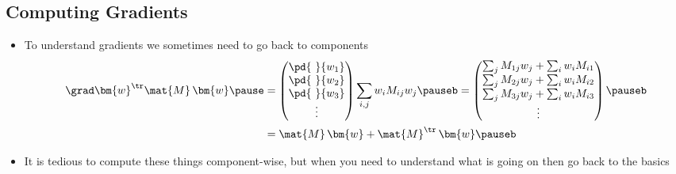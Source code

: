 \begin{slide}
\section{Computing Gradients}

\begin{PauseHighLight}
  \begin{itemize}
  \item To understand gradients we sometimes need to go back to
    components\pause
    \begin{align*}
      \grad \bm{w}^\tr \mat{M}\, \bm{w}\pause &=
      \begin{pmatrix}
        \pd{\ }{w_1} \\  \pd{\ }{w_2} \\  \pd{\ }{w_3} \\ \vdots
      \end{pmatrix}
      \sum_{i,j} w_i M_{ij} w_j \pauseb =
      \begin{pmatrix}
        \sum_j M_{1j} w_j + \sum_i w_i M_{i1} \\
        \sum_j M_{2j} w_j + \sum_i w_i M_{i2} \\
        \sum_j M_{3j} w_j + \sum_i w_i M_{i3} \\ \vdots
      \end{pmatrix} \pauseb\\
      &= \mat{M}\, \bm{w} + \mat{M}^\tr\, \bm{w}\pauseb
    \end{align*}
  \item It is tedious to compute these things component-wise, but when
    you need to understand what is going on then go back to the basics\pauseb
  \end{itemize}
\end{PauseHighLight}
  

\end{slide}



\Outline %

